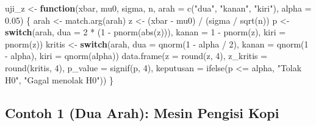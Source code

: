 \documentclass[
  indonesian,
  letterpaper,
]{book}
\newenvironment{Shaded}{\begin{snugshade}}{\end{snugshade}}
\newcommand{\AttributeTok}[1]{\textcolor[rgb]{0.40,0.45,0.13}{#1}}
\newcommand{\ControlFlowTok}[1]{\textcolor[rgb]{0.00,0.23,0.31}{\textbf{#1}}}
\newcommand{\DecValTok}[1]{\textcolor[rgb]{0.68,0.00,0.00}{#1}}
\newcommand{\FloatTok}[1]{\textcolor[rgb]{0.68,0.00,0.00}{#1}}
\newcommand{\FunctionTok}[1]{\textcolor[rgb]{0.28,0.35,0.67}{#1}}
\newcommand{\NormalTok}[1]{\textcolor[rgb]{0.00,0.23,0.31}{#1}}
\newcommand{\OtherTok}[1]{\textcolor[rgb]{0.00,0.23,0.31}{#1}}
\newcommand{\SpecialCharTok}[1]{\textcolor[rgb]{0.37,0.37,0.37}{#1}}
\newcommand{\StringTok}[1]{\textcolor[rgb]{0.13,0.47,0.30}{#1}}
\begin{document}
\begin{Shaded}
\begin{Highlighting}[]
\NormalTok{uji\_z }\OtherTok{\textless{}{-}} \ControlFlowTok{function}\NormalTok{(xbar, mu0, sigma, n, }\AttributeTok{arah =} \FunctionTok{c}\NormalTok{(}\StringTok{"dua"}\NormalTok{, }\StringTok{"kanan"}\NormalTok{, }\StringTok{"kiri"}\NormalTok{), }\AttributeTok{alpha =} \FloatTok{0.05}\NormalTok{) \{}
\NormalTok{  arah }\OtherTok{\textless{}{-}} \FunctionTok{match.arg}\NormalTok{(arah)}
\NormalTok{  z }\OtherTok{\textless{}{-}}\NormalTok{ (xbar }\SpecialCharTok{{-}}\NormalTok{ mu0) }\SpecialCharTok{/}\NormalTok{ (sigma }\SpecialCharTok{/} \FunctionTok{sqrt}\NormalTok{(n))}
\NormalTok{  p }\OtherTok{\textless{}{-}} \ControlFlowTok{switch}\NormalTok{(arah,}
              \AttributeTok{dua =} \DecValTok{2} \SpecialCharTok{*}\NormalTok{ (}\DecValTok{1} \SpecialCharTok{{-}} \FunctionTok{pnorm}\NormalTok{(}\FunctionTok{abs}\NormalTok{(z))),}
              \AttributeTok{kanan =} \DecValTok{1} \SpecialCharTok{{-}} \FunctionTok{pnorm}\NormalTok{(z),}
              \AttributeTok{kiri =} \FunctionTok{pnorm}\NormalTok{(z))}
\NormalTok{  kritis }\OtherTok{\textless{}{-}} \ControlFlowTok{switch}\NormalTok{(arah,}
                   \AttributeTok{dua =} \FunctionTok{qnorm}\NormalTok{(}\DecValTok{1} \SpecialCharTok{{-}}\NormalTok{ alpha }\SpecialCharTok{/} \DecValTok{2}\NormalTok{),}
                   \AttributeTok{kanan =} \FunctionTok{qnorm}\NormalTok{(}\DecValTok{1} \SpecialCharTok{{-}}\NormalTok{ alpha),}
                   \AttributeTok{kiri =} \FunctionTok{qnorm}\NormalTok{(alpha))}
  \FunctionTok{data.frame}\NormalTok{(}\AttributeTok{z =} \FunctionTok{round}\NormalTok{(z, }\DecValTok{4}\NormalTok{),}
             \AttributeTok{z\_kritis =} \FunctionTok{round}\NormalTok{(kritis, }\DecValTok{4}\NormalTok{),}
             \AttributeTok{p\_value =} \FunctionTok{signif}\NormalTok{(p, }\DecValTok{4}\NormalTok{),}
             \AttributeTok{keputusan =} \FunctionTok{ifelse}\NormalTok{(p }\SpecialCharTok{\textless{}=}\NormalTok{ alpha, }\StringTok{"Tolak H0"}\NormalTok{, }\StringTok{"Gagal menolak H0"}\NormalTok{))}
\NormalTok{\}}
\end{Highlighting}
\end{Shaded}

\subsection{Contoh 1 (Dua Arah): Mesin Pengisi
Kopi}\label{contoh-1-dua-arah-mesin-pengisi-kopi}
\end{document}
